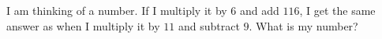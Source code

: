 I am thinking of a number. If I multiply it by $6$ and add $116$, I get the same answer as when I multiply it by $11$ and subtract $9$. What is my number?
